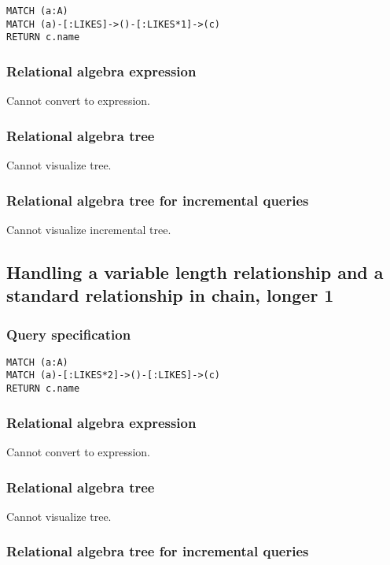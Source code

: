 \begin{lstlisting}
MATCH (a:A)
MATCH (a)-[:LIKES]->()-[:LIKES*1]->(c)
RETURN c.name
\end{lstlisting}

\subsubsection*{Relational algebra expression}

Cannot convert to expression.

\subsubsection*{Relational algebra tree}

Cannot visualize tree.

\subsubsection*{Relational algebra tree for incremental queries}

Cannot visualize incremental tree.

\subsection{Handling a variable length relationship and a standard relationship in chain, longer 1}

\subsubsection*{Query specification}

\begin{lstlisting}
MATCH (a:A)
MATCH (a)-[:LIKES*2]->()-[:LIKES]->(c)
RETURN c.name
\end{lstlisting}

\subsubsection*{Relational algebra expression}

Cannot convert to expression.

\subsubsection*{Relational algebra tree}

Cannot visualize tree.

\subsubsection*{Relational algebra tree for incremental queries}

